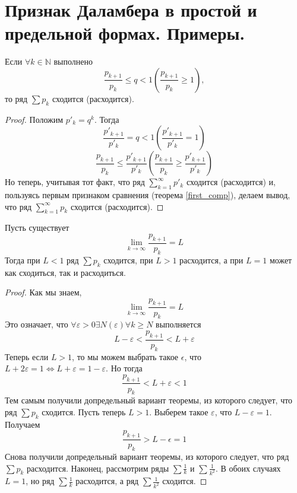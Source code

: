\section{Признак Даламбера в простой и предельной формах. Примеры.}

\begin{theorem}
    Если $\forall k \in \mathbb{N}$ выполнено
    \[
        \frac{p_{k+1}}{p_{k}} \leqslant q < 1
        \left(
            \frac{p_{k+1}}{p_{k}} \geqslant 1
        \right)
        ,
    \] то ряд $\sum p_k$ сходится (расходится).
    \begin{proof}
        Положим $p'_k = q^k$. Тогда
        \[
            \frac{p'_{k+1}}{p'_k} = q < 1
            \left(
                \frac{p'_{k+1}}{p'_k} = 1
            \right)
        \]
        \[
            \frac{p_{k+1}}{p_{k}} \leqslant
            \frac{p'_{k+1}}{p'_{k}}
            \left(
                \frac{p_{k+1}}{p_{k}} \geqslant
                \frac{p'_{k+1}}{p'_{k}}
            \right)
        \]
        Но теперь, учитывая тот факт, что ряд $\sum_{k=1}^{\infty} p'_k$ сходится (расходится) и, пользуясь первым признаком сравнения (теорема \ref{first_comp}), делаем вывод, что ряд $\sum_{k=1}^{\infty} p_k$ сходится (расходится).
    \end{proof}
\end{theorem}

\begin{theorem}
    Пусть существует
    \[
        \lim_{k \to \infty} \frac{p_{k+1}}{p_{k}} = L
    \]
    Тогда при $L < 1$ ряд $\sum p_k$ сходится, при $L > 1$ расходится, а при $L = 1$ может как сходиться, так и расходиться.
    \begin{proof}
        Как мы знаем,
        \[
            \lim_{k \to \infty} \frac{p_{k+1}}{p_{k}} = L
        \]
        Это означает, что $\forall \varepsilon > 0 \exists N(\varepsilon) \forall k \geqslant N$ выполняется
        \[
            L - \varepsilon < \frac{p_{k+1}}{p_{k}} < L + \varepsilon
        \]
        Теперь если $L > 1$, то мы можем выбрать такое $\epsilon$, что $L + 2 \varepsilon = 1 \Leftrightarrow L + \varepsilon = 1 - \varepsilon$. Но тогда
        \[
            \frac{p_{k+1}}{p_k} < L + \varepsilon < 1
        \]
        Тем самым получили допредельный вариант теоремы, из которого следует, что ряд $\sum p_k$ сходится.
        \newline
        Пусть теперь $L > 1$. Выберем такое $\varepsilon$, что $L - \varepsilon = 1$. Получаем
        \[
            \frac{p_{k+1}}{p_k} > L - \epsilon = 1
        \]
        Снова получили допредельный вариант теоремы, из которого следует, что ряд $\sum p_k$ расходится.
        \newline
        Наконец, рассмотрим ряды $\sum \frac{1}{k}$ и $\sum \frac{1}{k^2}$. В обоих случаях $L=1$, но ряд $\sum \frac{1}{k}$ расходится, а ряд $\sum \frac{1}{k^2}$ сходится.
    \end{proof}
\end{theorem}